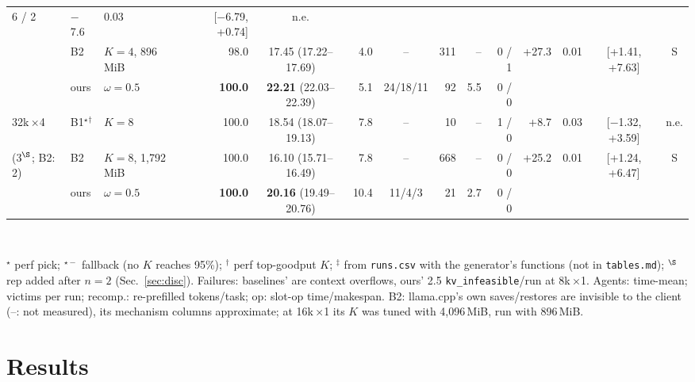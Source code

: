 \documentclass[conference]{IEEEtran}
\newcommand{\K}{$K$}
\newcommand{\x}{$\times$}
\newcommand{\pick}{$^\star$}
\newcommand{\pickf}{$^{\star-}$}
\newcommand{\topk}{$^\dagger$}
\newcommand{\calc}{$^\ddagger$}
\newcommand{\late}{$^\S$}
\begin{document}
\begin{table}[!t]
\begin{tabular}{@{}lllrcrcrrrrrcc@{}}
      6 / 2 & $-$7.6 & 0.03 & [$-$6.79, +0.74] & n.e. \\
     & B2 & $K{=}4$, 896\,MiB & 98.0 & 17.45 (17.22--17.69) & 4.0 & -- & 311 & -- & 0 / 1 &
      +27.3 & 0.01 & [+1.41, +7.63] & S \\
     & ours & $\omega{=}0.5$ & \textbf{100.0} & \textbf{22.21} (22.03--22.39) & 5.1 &
      24/18/11 & 92 & 5.5 & 0 / 0 & & & & \\
    \midrule
    32k\,\x4 & B1\pick\topk & $K{=}8$ & 100.0 & 18.54 (18.07--19.13) & 7.8 & -- & 10 & -- & 1 / 0 &
      +8.7 & 0.03 & [$-$1.32, +3.59] & n.e. \\
    (3\late; B2: 2) & B2 & $K{=}8$, 1,792\,MiB & 100.0 & 16.10 (15.71--16.49) & 7.8 & -- & 668 & -- & 0 / 0
      & +25.2 & 0.01 & [+1.24, +6.47] & S \\
     & ours & $\omega{=}0.5$ & \textbf{100.0} & \textbf{20.16} (19.49--20.76) & 10.4 &
      11/4/3 & 21 & 2.7 & 0 / 0 & & & & \\
    \bottomrule
  \end{tabular}\\[2pt]
  \parbox{\textwidth}{\raggedright\scriptsize \pick{} perf pick; \pickf{} fallback (no \K{} reaches 95\%);
  \topk{} perf top-goodput \K; \calc{} from \texttt{runs.csv} with the generator's functions (not in
  \texttt{tables.md}); \late{} rep added after $n=2$ (Sec.~\ref{sec:disc}). Failures: baselines' are
  context overflows, ours' 2.5 \texttt{kv\_infeasible}/run at 8k\,\x1. Agents: time-mean; victims per
  run; recomp.: re-prefilled tokens/task; op: slot-op time/makespan. B2: llama.cpp's own
  saves/restores are invisible to the client (--: not measured), its mechanism columns approximate;
  at 16k\,\x1 its \K{} was tuned with 4,096\,MiB, run with 896\,MiB.}
\end{table}

\section{Results}
\end{document}
